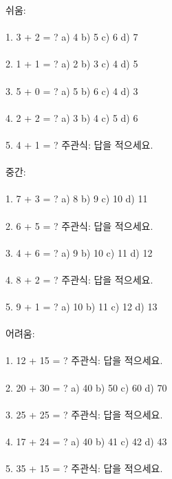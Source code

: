 \documentclass[fleqn]{article}
\begin{document}
      
      쉬움: \\\\  
1. 3 + 2 = ?  
   a) 4  
   b) 5  
   c) 6  
   d) 7 \\\\  

2. 1 + 1 = ?  
   a) 2  
   b) 3  
   c) 4  
   d) 5 \\\\  

3. 5 + 0 = ?  
   a) 5  
   b) 6  
   c) 4  
   d) 3 \\\\  

4. 2 + 2 = ?  
   a) 3  
   b) 4  
   c) 5  
   d) 6 \\\\  

5. 4 + 1 = ?  
   주관식: 답을 적으세요. \\\\  

중간: \\\\  
1. 7 + 3 = ?  
   a) 8  
   b) 9  
   c) 10  
   d) 11 \\\\  

2. 6 + 5 = ?  
   주관식: 답을 적으세요. \\\\  

3. 4 + 6 = ?  
   a) 9  
   b) 10  
   c) 11  
   d) 12 \\\\  

4. 8 + 2 = ?  
   주관식: 답을 적으세요. \\\\  

5. 9 + 1 = ?  
   a) 10  
   b) 11  
   c) 12  
   d) 13 \\\\  

어려움: \\\\  
1. 12 + 15 = ?  
   주관식: 답을 적으세요. \\\\  

2. 20 + 30 = ?  
   a) 40  
   b) 50  
   c) 60  
   d) 70 \\\\  

3. 25 + 25 = ?  
   주관식: 답을 적으세요. \\\\  

4. 17 + 24 = ?  
   a) 40  
   b) 41  
   c) 42  
   d) 43 \\\\  

5. 35 + 15 = ?  
   주관식: 답을 적으세요. \\\\  

      
      
\end{document}
